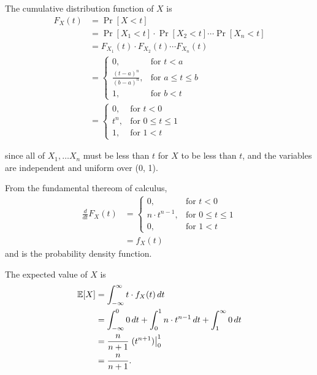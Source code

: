 \documentclass[11pt]{article}
\begin{document}
\begin{solution}

\begin{Parts}
    
\Part The cumulative distribution function of $X$ is
\[
    \begin{split}
        F_X(t) &= \Pr[X < t] \\
        &= \Pr[X_1 < t] \cdot \Pr[X_2 < t] \cdots \Pr[X_n < t] \\
        &= F_{X_1}(t) \cdot F_{X_2}(t) \cdots F_{X_n}(t) \\
        &= \begin{cases}
            0, & \text{for } t < a \\
            \frac{(t-a)^n}{(b-a)^n}, & \text{for } a \leq t \leq b \\
            1, & \text{for } b < t
        \end{cases} \\
        &= \begin{cases}
            0, & \text{for } t < 0 \\
            t^n, & \text{for } 0 \leq t \leq 1 \\
            1, & \text{for } 1 < t
        \end{cases}
    \end{split}
\]

since all of $X_1, \dots X_n$ must be less than $t$ for $X$ to be less than $t$,
and the variables are independent and uniform over (0, 1).

\Part From the fundamental thereom of calculus,
\[
    \begin{split}
        \frac{d}{dt} F_X(t) &= \begin{cases}
            0, & \text{for } t < 0 \\
            n \cdot t^{n-1}, & \text{for } 0 \leq t \leq 1 \\
            0, & \text{for } 1 < t
        \end{cases} \\
        &= f_X(t)
    \end{split}
\]
and is the probability density function. 

\Part The expected value of $X$ is
\[
    \begin{split}
        \operatorname{\mathbb{E}}[X] &= \int_{-\infty}^{\infty} t \cdot f_X(t) \, dt \\
        &= \int_{-\infty}^{0} 0 \, dt + \int_{0}^{1} n \cdot t^{n-1} \, dt + \int_{1}^{\infty} 0 \, dt \\
        &= \frac{n}{n+1} \left. (t^{n+1}) \right|_0^1 \\
        &= \frac{n}{n+1}.
    \end{split}
\]


\end{Parts}
\end{solution}
\end{document}
